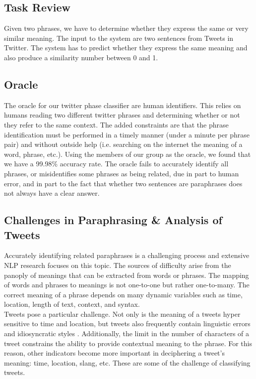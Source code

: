 \documentclass[conference]{IEEEtran}
\begin{document}
\subsection{Task Review}
Given two phrases, we have to determine whether they express the same or very similar meaning. The input to the system are two sentences from Tweets in Twitter. The system has to predict whether they express the same meaning and also produce a similarity number between 0 and 1.\\

\subsection{Oracle}
The oracle for our twitter phase classifier are human identifiers. This relies on humans reading two different twitter phrases and determining whether or not they refer to the same context. The added constraints are that the phrase identification must be performed in a timely manner (under a minute per phrase pair) and without outside help (i.e. searching on the internet the meaning of a word, phrase, etc.). Using the members of our group as the oracle, we found that we have a 99.98\% accuracy rate. The oracle fails to accurately identify all phrases, or misidentifies some phrases as being related, due in part to human error, and in part to the fact that whether two sentences are paraphrases does not always have a clear answer. \\

\subsection{Challenges in Paraphrasing \& Analysis of Tweets}
Accurately identifying related paraphrases is a challenging process and extensive NLP research focuses on this topic. The sources of difficulty arise from the panoply of meanings that can be extracted from words or phrases. The mapping of words and phrases to meanings is not one-to-one but rather one-to-many. The correct meaning of a phrase depends on many dynamic variables such as time, location, length of text, context, and syntax. \\

Tweets pose a particular challenge. Not only is the meaning of a tweets hyper sensitive to time and location, but tweets also frequently contain linguistic errors and idiosyncratic styles \cite{derczynski}. Additionally, the limit in the number of characters of a tweet constrains the ability to provide contextual meaning to the phrase. For this reason, other indicators become more important in deciphering a tweet's meaning: time, location, slang, etc. These are some of the challenge of classifying tweets. \\
\end{document}
